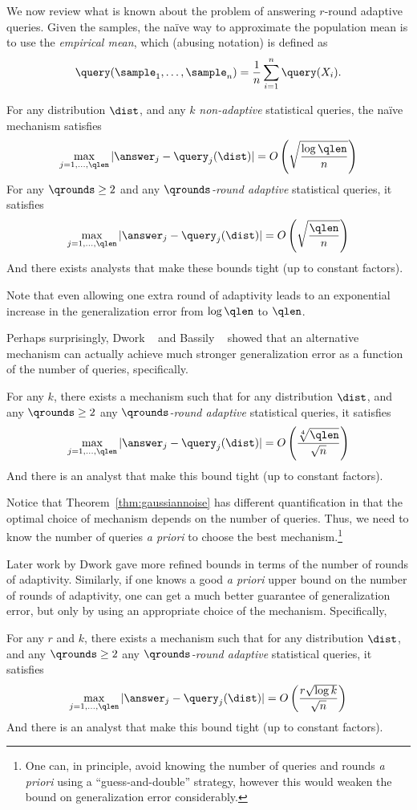 We now review what is known about the problem of answering $r$-round adaptive queries.  Given the samples, the na\"ive way to approximate the population mean is to use the \emph{empirical mean}, which (abusing notation) is defined as $$\query(\sample_1,\dots,\sample_n) = \frac{1}{n} \sum_{i=1}^{n} \query(X_i).$$
\begin{thm} For any distribution $\dist$, and any $k$ \emph{non-adaptive} statistical queries, the na\"ive mechanism satisfies
$$
\max_{j=1,\dots,\qlen} | \answer_j - \query_j(\dist) | = O\left( \sqrt{\frac{\log \qlen}{n}}  \right)
$$
For any $\qrounds \geq 2$ and any \emph{$\qrounds$-round adaptive} statistical queries, it satisfies
$$
\max_{j=1,\dots,\qlen} | \answer_j - \query_j(\dist) | = O\left( \sqrt{\frac{\qlen}{n}}  \right)
$$
And there exists analysts that make these bounds tight (up to constant factors).
\end{thm}

Note that even allowing one extra round of adaptivity leads to an exponential increase in the generalization error from $\log \qlen$ to $\qlen$.

Perhaps surprisingly, Dwork \etal~\cite{DworkFHPRR15} and Bassily \etal~\cite{BassilyNSSSU16} showed that an alternative mechanism can actually achieve much stronger generalization error as a function of the number of queries, specifically.
\begin{thm} \label{thm:gaussiannoise} For any $k$, there exists a mechanism such that for any distribution $\dist$, and any $\qrounds \geq 2$ any \emph{$\qrounds$-round adaptive} statistical queries, it satisfies
$$
\max_{j=1,\dots,\qlen} | \answer_j - \query_j(\dist) | = O\left( \frac{\sqrt[4]{\qlen}}{\sqrt{n}}  \right)
$$
And there is an analyst that make this bound tight (up to constant factors).
\end{thm}
Notice that Theorem~\ref{thm:gaussiannoise} has different quantification in that the optimal choice of mechanism depends on the number of queries.  Thus, we need to know the number of queries \emph{a priori} to choose the best mechanism.\footnote{ \label{fn1} One can, in principle, avoid knowing the number of queries and rounds \emph{a priori} using a ``guess-and-double'' strategy, however this would weaken the bound on generalization error considerably.}

Later work by Dwork 
gave more refined bounds in terms of the number of rounds of adaptivity.  Similarly, if one knows a good \emph{a priori} upper bound on the number of rounds of adaptivity, one can get a much better guarantee of generalization error, but only by using an appropriate choice of the mechanism. %
Specifically, 
\begin{thm} \label{thm:gaussiannoise2} For any $r$ and $k$, there exists a mechanism such that for any distribution $\dist$, and any $\qrounds \geq 2$ any \emph{$\qrounds$-round adaptive} statistical queries, it satisfies
$$
\max_{j=1,\dots,\qlen} | \answer_j - \query_j(\dist) | = O\left( \frac{r \sqrt{\log k}}{\sqrt{n}}  \right)
$$
And there is an analyst that make this bound tight (up to constant factors).
\end{thm}


